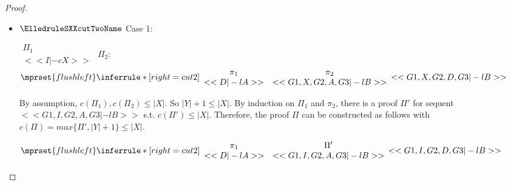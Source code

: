 \begin{proof}
\begin{enumerate}
\begin{itemize}
    \item $\ElledruleSXXcutTwoName$ Case 1:
      \begin{center}
        \scriptsize
        \begin{math}
          \begin{array}{c}
            \Pi_1 \\
            {<<I |-c X>>}
          \end{array}
        \end{math}
        \qquad\qquad
        $\Pi_2$:
        \begin{math}
          $$\mprset{flushleft}
          \inferrule* [right={\tiny cut2}] {
            {
              \begin{array}{cc}
                \pi_1 & \pi_2 \\
                {<<D |-l A>>} & {<<G1, X, G2, A, G3 |-l B>>}
              \end{array}
            }
          }{<<G1, X, G2, D, G3 |-l B>>}
        \end{math}
      \end{center}
      By assumption, $c(\Pi_1),c(\Pi_2)\leq |X|$. So $|Y|+1 \leq |X|$. By induction on $\Pi_1$
      and $\pi_2$, there is a proof $\Pi'$ for sequent $<<G1, I, G2, A, G3 |-l B>>$ s.t.
      $c(\Pi') \leq |X|$. Therefore, the proof $\Pi$ can be constructed as follows with
      $c(\Pi) = max\{\Pi', |Y|+1\} \leq |X|$.
      \begin{center}
        \scriptsize
        \begin{math}
          $$\mprset{flushleft}
          \inferrule* [right={\tiny cut2}] {
            {
              \begin{array}{cc}
                \pi_1 & \Pi' \\
                {<<D |-l A>>} & {<<G1, I, G2, A, G3 |-l B>>}
              \end{array}
            }
          }{<<G1, I, G2, D, G3 |-l B>>}
        \end{math}
      \end{center}


\end{itemize}
\end{enumerate}
\end{proof}
